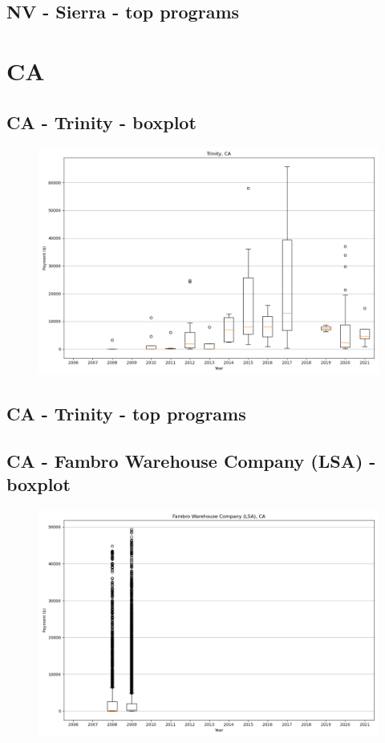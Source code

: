 \subsection*{NV - Sierra - top programs}

\newpage
\section*{CA}
\subsection*{CA - Trinity - boxplot}
\begin{figure}[h]
\centering
\includegraphics[width=7in]{../output/boxplots/counties/Trinity-CA_boxplot.png}
\end{figure}


\subsection*{CA - Trinity - top programs}

\newpage
\subsection*{CA - Fambro Warehouse Company (LSA) - boxplot}
\begin{figure}[h]
\centering
\includegraphics[width=7in]{../output/boxplots/counties/Fambro Warehouse Company (LSA)-CA_boxplot.png}
\end{figure}


